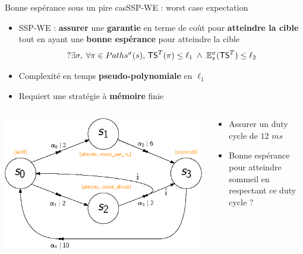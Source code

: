 \documentclass[compress]{beamer}
\newcommand\TS{\text{\sffamily TS}}
\theoremstyle{theorem}%
\begin{document}
\begin{frame}{Bonne espérance sous un pire cas}{SSP-WE : worst case expectation}\footnotesize
  \vspace{-.05\linewidth}
  \begin{itemize}
    \item SSP-WE : \textbf{\color{fibeamer@orange}assurer} une \textbf{\color{fibeamer@orange}garantie} en terme de coût pour \textbf{\color{fibeamer@orange}atteindre la cible} tout en ayant une \textbf{\color{fibeamer@orange}bonne espérance} pour atteindre la cible
    \[
      ?\exists \sigma, \; \forall \pi \in Paths^\sigma(s), \, \TS^T(\pi) \leq \ell_1 \; \wedge \; \mathbb{E}^\sigma_s(\TS^T) \leq \ell_2
    \]
  \item Complexité en temps \textbf{\color{fibeamer@orange}pseudo-polynomiale} en $\ell_1$
  \item Requiert une stratégie à \textbf{\color{fibeamer@orange}mémoire} finie
  \end{itemize}
    \begin{columns}
      \begin{column}{0.45\linewidth}
        \includegraphics[width=\linewidth]{resources/main-mdp3}
      \end{column}
      \begin{column}{0.55\linewidth}\footnotesize
        \begin{itemize}
          \item Assurer un duty cycle de $12$ $ms$
          \item Bonne espérance pour atteindre {\color{DarkOrange}sommeil} en respectant ce duty cycle ?
        \end{itemize}
      \end{column}
    \end{columns}
\end{frame}
\end{document}
